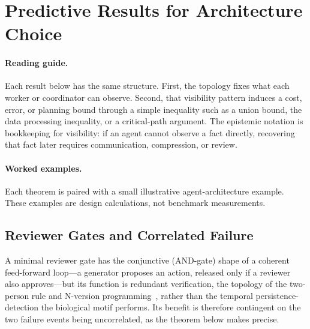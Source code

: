 \section{Predictive Results for Architecture Choice}

\paragraph{Reading guide.}
Each result below has the same structure. First, the topology fixes what each worker or coordinator can
observe. Second, that visibility pattern induces a cost, error, or planning bound through a simple
inequality such as a union bound, the data processing inequality, or a critical-path argument. The
epistemic notation is bookkeeping for visibility: if an agent cannot observe a fact directly, recovering
that fact later requires communication, compression, or review.

\paragraph{Worked examples.}
Each theorem is paired with a small illustrative agent-architecture example. These examples are design
calculations, not benchmark measurements.

\subsection{Reviewer Gates and Correlated Failure}

A minimal reviewer gate has the conjunctive (AND-gate) shape of a coherent feed-forward loop---a generator
proposes an action, released only if a reviewer also approves---but its function is redundant verification, the
topology of the two-person rule and N-version programming~\cite{knight1986}, rather than the temporal
persistence-detection the biological motif performs. Its benefit is therefore contingent on the two failure
events being uncorrelated, as the theorem below makes precise.

